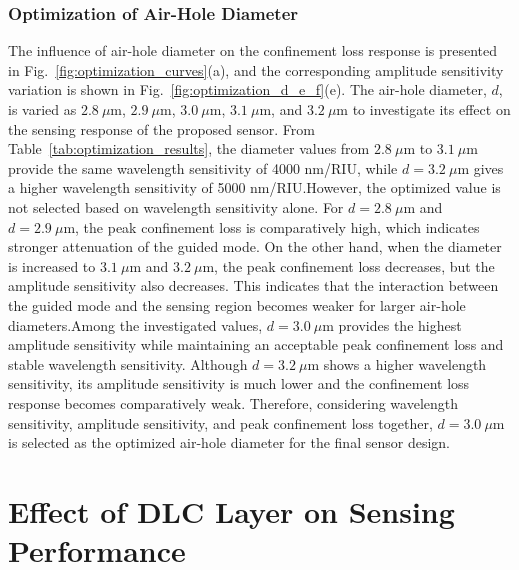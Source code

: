 \documentclass[preprint,12pt]{elsarticle}
\begin{document}
\subsubsection{\textbf{{Optimization of Air-Hole Diameter}}}
The influence of air-hole diameter on the confinement loss response is presented in Fig.~\ref{fig:optimization_curves}(a), and the corresponding amplitude sensitivity variation is shown in Fig.~\ref{fig:optimization_d_e_f}(e). The air-hole diameter, $d$, is varied as $2.8~\mu\mathrm{m}$, $2.9~\mu\mathrm{m}$, $3.0~\mu\mathrm{m}$, $3.1~\mu\mathrm{m}$, and $3.2~\mu\mathrm{m}$ to investigate its effect on the sensing response of the proposed sensor. From Table~\ref{tab:optimization_results}, the diameter values from $2.8~\mu\mathrm{m}$ to $3.1~\mu\mathrm{m}$ provide the same wavelength sensitivity of 4000 nm/RIU, while $d=3.2~\mu\mathrm{m}$ gives a higher wavelength sensitivity of 5000 nm/RIU.However, the optimized value is not selected based on wavelength sensitivity alone. For $d=2.8~\mu\mathrm{m}$ and $d=2.9~\mu\mathrm{m}$, the peak confinement loss is comparatively high, which indicates stronger attenuation of the guided mode. On the other hand, when the diameter is increased to $3.1~\mu\mathrm{m}$ and $3.2~\mu\mathrm{m}$, the peak confinement loss decreases, but the amplitude sensitivity also decreases. This indicates that the interaction between the guided mode and the sensing region becomes weaker for larger air-hole diameters.Among the investigated values, $d=3.0~\mu\mathrm{m}$ provides the highest amplitude sensitivity while maintaining an acceptable peak confinement loss and stable wavelength sensitivity. Although $d=3.2~\mu\mathrm{m}$ shows a higher wavelength sensitivity, its amplitude sensitivity is much lower and the confinement loss response becomes comparatively weak. Therefore, considering wavelength sensitivity, amplitude sensitivity, and peak confinement loss together, $d=3.0~\mu\mathrm{m}$ is selected as the optimized air-hole diameter for the final sensor design.


\section{\textbf{Effect of DLC Layer on Sensing Performance}}
\end{document}
